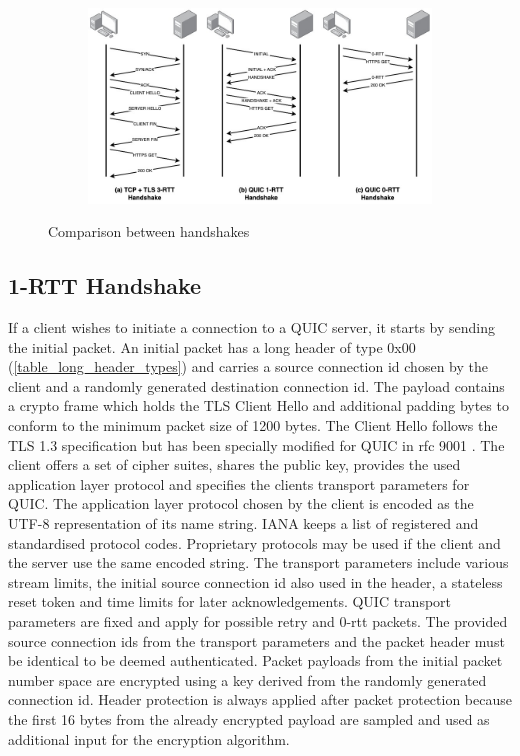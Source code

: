 \begin{figure}[h]
  \centering
  \begin{subfigure}[b]{1.0\textwidth}
    \includegraphics[width=1.0\linewidth]{img/handshake_illustration.jpg}
  \end{subfigure}
  \caption{Comparison between handshakes}
  \label{handshake_comparison}
\end{figure}

\subsection{1-RTT Handshake}

If a client wishes to initiate a connection to a QUIC server, it starts by sending the initial packet. An initial packet has a long
header of type 0x00 (\ref{table_long_header_types}) and carries a source connection id chosen by the client and a randomly generated
destination connection id. The payload contains a crypto frame which holds the TLS Client Hello and additional padding bytes to conform
to the minimum packet size of 1200 bytes. The Client Hello follows the TLS 1.3 specification \cite{rfc8446} but has been specially
modified for QUIC in rfc 9001 \cite{rfc9001}. The client offers a set of cipher suites, shares the public key, provides the used 
application layer protocol and specifies the clients transport parameters for QUIC. The application layer protocol chosen by the client
is encoded as the UTF-8 representation of its name string. IANA keeps a list of registered and standardised protocol codes. Proprietary
protocols may be used if the client and the server use the same encoded string. The transport parameters include various stream limits,
the initial source connection id also used in the header, a stateless reset token and time limits for later acknowledgements.
QUIC transport parameters are fixed and apply for possible retry and 0-rtt packets. The provided source connection ids from the
transport parameters and the packet header must be identical to be deemed authenticated. Packet payloads from the initial packet
number space are encrypted using a key derived from the randomly generated connection id. Header protection is always applied
after packet protection because the first 16 bytes from the already encrypted payload are sampled and used as additional input
for the encryption algorithm.

